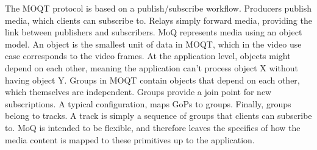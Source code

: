 The \ac{MOQT} protocol is based on a publish/subscribe workflow. Producers publish media, which clients can subscribe to. Relays simply forward media, providing the link between publishers and subscribers. \ac{MoQ} represents media using an object model. An object is the smallest unit of data in MOQT, which in the video use case corresponds to the video frames. At the application level, objects might depend on each other, meaning the application can't process object X without having object Y. Groups in MOQT contain objects that depend on each other, which themselves are independent. Groups provide a join point for new subscriptions. A typical configuration, maps GoPs to groups. Finally, groups belong to tracks. A track is simply a sequence of groups that clients can subscribe to. MoQ is intended to be flexible, and therefore leaves the specifics of how the media content is mapped to these primitives up to the application. 
